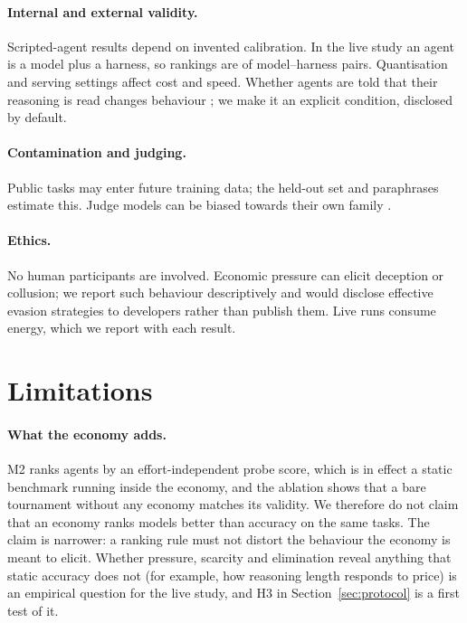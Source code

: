 \documentclass[11pt]{article}
\theoremstyle{plain}
\theoremstyle{remark}
\begin{document}
\paragraph{Internal and external validity.}
Scripted-agent results depend on invented calibration. In the live study an agent is a model plus a harness, so rankings are of model--harness pairs. Quantisation and serving settings affect cost and speed. Whether agents are told that their reasoning is read changes behaviour \citep{greenblatt2024alignment}; we make it an explicit condition, disclosed by default.

\paragraph{Contamination and judging.}
Public tasks may enter future training data; the held-out set and paraphrases estimate this. Judge models can be biased towards their own family \citep{zheng2023judging}.

\paragraph{Ethics.}
No human participants are involved. Economic pressure can elicit deception or collusion; we report such behaviour descriptively and would disclose effective evasion strategies to developers rather than publish them. Live runs consume energy, which we report with each result.

\section{Limitations}
\label{sec:limits}
\paragraph{What the economy adds.}
M2 ranks agents by an effort-independent probe score, which is in effect a static benchmark running inside the economy, and the ablation shows that a bare tournament without any economy matches its validity. We therefore do not claim that an economy ranks models better than accuracy on the same tasks. The claim is narrower: a ranking rule must not distort the behaviour the economy is meant to elicit. Whether pressure, scarcity and elimination reveal anything that static accuracy does not (for example, how reasoning length responds to price) is an empirical question for the live study, and H3 in Section~\ref{sec:protocol} is a first test of it.
\end{document}

